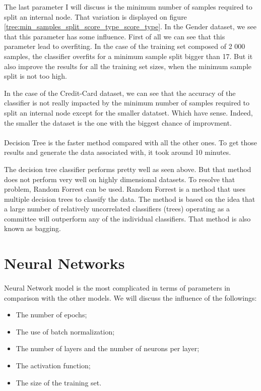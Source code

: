 \documentclass[10pt]{article}
\begin{document}
			The last parameter I will discuss is the minimum number of samples required to split an internal node. That variation is displayed on figure \ref{tree:min_samples_split_score_type_score_type}.
			In the Gender dataset, we see that this parameter has some influence. First of all we can see that this parameter lead to overfiting. In the case of the training set composed of 2 000 samples, the classifier overfits for a minimum sample split bigger than 17. But it also improve the results for all the training set sizes, when the minimum sample split is not too high.

			In the case of the Credit-Card dataset, we can see that the accuracy of the classifier is not really impacted by the minimum number of samples required to split an internal node except for the smaller datatset. Which have sense. Indeed, the smaller the dataset is the one with the biggest chance of improvment.
		\paragraph*{}
			Decision Tree is the faster method compared with all the other ones. To get those results and generate the data associated with, it took around 10 minutes.

			The decision tree classifier performs pretty well as seen above. But that method does not perform very well on highly dimensional datasets. To resolve that problem, Random Forrest can be used. Random Forrest is a method that uses multiple decision trees to classify the data. The method is based on the idea that a large number of relatively uncorrelated classifiers (trees) operating as a committee will outperform any of the individual classifiers. That method is also known as bagging.
	\section{Neural Networks}
		\paragraph*{}
			Neural Network model is the most complicated in terms of parameters in comparison with the other models. We will discuss the influence of the followings:
			\begin{itemize}
				\item The number of epochs;
				\item The use of batch normalization;
				\item The number of layers and the number of neurons per layer;
				\item The activation function;
				\item The size of the training set.
			\end{itemize}
\end{document}
